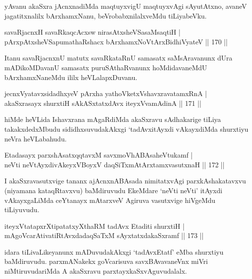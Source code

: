 \begin{artha}
yAvanu akaSxra jAcnxnadiMda maqtuyxvigU maqtuyxvAgi sAyutAtxno, avaneV jagatitxnalilx bArxhamxNanu, beVrobabxnilalxveMdu tiLiyabeVku.
\end{artha}


\begin{shl}
savaRjacnxH savaRkaqcAcxsw nirasAtxsheVSasaMsaqtiH |\\
pArxpAtxsheVSapumathaRshacx bArxhamxNoV\s tArxBidhiVyateV \hfill || 170 ||
\end{shl}

\begin{artha}
Itanu savaRjacnxnU matutx savaRkataRnU samasatx saMsAravanunx dUra mADikoMDavanU samasatx puruSAthaRvanunx hoMdidavaneMdU bArxhamxNaneMdu ililx heVLalapxDuvanu.
\end{artha}

\begin{shl}
jecnxVyatavxsidadhxyeV pArxha yathoVketxVshavxravatamxRnA |\\
akaSxrasayx shurxtiH sAkASxtatxdAvx iteyxVvamAdinA \hfill || 171 ||
\end{shl}

\begin{artha}
hiMde heVLida Ishavxrana mAgaRdiMda akaSxravu sAdhakarige tiLiya takakxdedxMbudu sididhxsuvudakAkxgi `tadAvx\mdash  itAyxdi vAkayxdiMda shurxtiyu neVra heVLabahudu.
\end{artha}

\begin{shl}
Etadasayx parxshAsatxqqtavxM savxmoVhABAsaheVtukamf |\\
neVti neVtAyxdivAkeyxVBoyxV daqSiTxmAtArxtamxvasutxnaH \hfill || 172 ||
\end{shl}

\begin{artha}%
I akaSxravasutxvige tananx ajAcnxnABAsada nimitatxvAgi parxkAshakatavxvu (niyamana kataqRtavxvu) baMdiruvudu EkeMdare `neVti neVti' itAyxdi vAkayxgaLiMda ceYtanayx mAtarxveV Agiruva vasutxvige hiVgeMdu tiLiyuvudu.
\end{artha}

\begin{shl}
iteyxVtatapxrXtipatatxyXthaRM tadAvx Etaditi shurxtiH |\\
mAgoVcarAtivatiRtAvxdadaqSaTxM sAyxtatxdakaSxramf \hfill || 173 ||
\end{shl}

\begin{artha}
idara tiLivaLikeyanunx mADuvudakAkxgi `tadAvxEtatf' eMba shurxtiyu baMdiruvudu. parxmANakekx goVcarisuva savxBAvavaneVnx miVri niMtiruvudariMda A akaSxravu parxtayxkaSxvAguvudalalx.
\end{artha}

